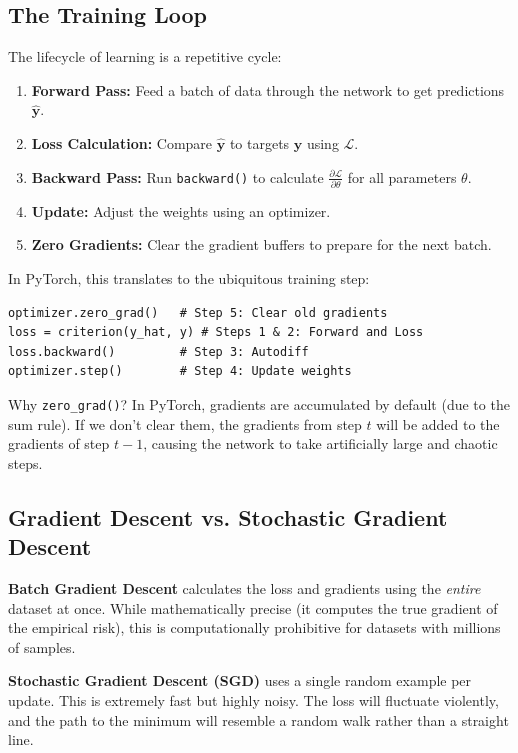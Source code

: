 \documentclass{tufte-handout}
\begin{document}
\subsection{The Training Loop}

The lifecycle of learning is a repetitive cycle:
\begin{enumerate}[leftmargin=*, itemsep=2pt]
    \item \textbf{Forward Pass:} Feed a batch of data through the network to get predictions $\hat{\mathbf{y}}$.
    \item \textbf{Loss Calculation:} Compare $\hat{\mathbf{y}}$ to targets $\mathbf{y}$ using $\mathcal{L}$.
    \item \textbf{Backward Pass:} Run \texttt{backward()} to calculate $\frac{\partial \mathcal{L}}{\partial \theta}$ for all parameters $\theta$.
    \item \textbf{Update:} Adjust the weights using an optimizer.
    \item \textbf{Zero Gradients:} Clear the gradient buffers to prepare for the next batch.
\end{enumerate}

In PyTorch, this translates to the ubiquitous training step:

\begin{lstlisting}[caption={The standard PyTorch training step.}]
optimizer.zero_grad()   # Step 5: Clear old gradients
loss = criterion(y_hat, y) # Steps 1 & 2: Forward and Loss
loss.backward()         # Step 3: Autodiff
optimizer.step()        # Step 4: Update weights
\end{lstlisting}

Why \texttt{zero\_grad()}? In PyTorch, gradients are accumulated by default (due to the sum rule). If we don't clear them, the gradients from step $t$ will be added to the gradients of step $t-1$, causing the network to take artificially large and chaotic steps.

\subsection{Gradient Descent vs. Stochastic Gradient Descent}

\textbf{Batch Gradient Descent} calculates the loss and gradients using the \textit{entire} dataset at once. While mathematically precise (it computes the true gradient of the empirical risk), this is computationally prohibitive for datasets with millions of samples.

\textbf{Stochastic Gradient Descent (SGD)} uses a single random example per update. This is extremely fast but highly noisy. The loss will fluctuate violently, and the path to the minimum will resemble a random walk rather than a straight line.
\end{document}
